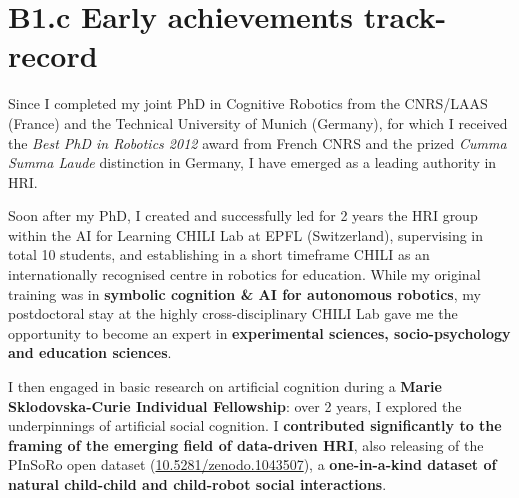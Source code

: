 \documentclass[11pt,a4paper]{report}
\newcommand{\eu}[1]{}
\begin{document}
\newpage
\chapter{B1.c Early achievements track-record}\label{early-achievements-track-record}

\eu{should list your important achievements,
including your most important publications (up to five for Starting Grant and up to ten for
Consolidator Grant) highlighting those as main author and/or without the co-authorship of your PhD
supervisor. The publications should be properly referenced, including all authors in the published
order (Please see section 1.1 on Research integrity). Field relevant bibliometric indicators as well as
research monographs and any translations thereof may also be included. If applicable include:
granted patent(s); invited presentations to internationally established conferences and/or
international advanced schools; Prizes/Awards/Academy memberships etc.}
\eu{(max 2 pages)}

Since I completed my joint PhD in Cognitive Robotics from the CNRS/LAAS (France) and the
Technical University of Munich (Germany), for which I received the \emph{Best
PhD in Robotics 2012} award from French CNRS and the prized \emph{Cumma Summa
Laude} distinction in Germany, I have emerged as a leading authority in
HRI.

Soon after my PhD, I created and successfully led for 2 years the HRI group
within the AI for Learning CHILI Lab at EPFL (Switzerland), supervising in total
10 students, and establishing in a short timeframe CHILI as an internationally
recognised centre in robotics for education. While my original training was in
\textbf{symbolic cognition \& AI for autonomous robotics}, my postdoctoral stay
at the highly cross-disciplinary CHILI Lab gave me the opportunity to become an
expert in \textbf{experimental sciences, socio-psychology and education
sciences}.

I then engaged in basic research on artificial cognition during a \textbf{Marie
Sklodovska-Curie Individual Fellowship}: over 2 years, I explored the underpinnings of
artificial social cognition. I \textbf{contributed significantly to the framing
of the emerging field of data-driven HRI}, also releasing of the PInSoRo open
dataset (\href{https://doi.org/10.5281/zenodo.1043507}{10.5281/zenodo.1043507}),
a \textbf{one-in-a-kind dataset of natural child-child and child-robot social
interactions}.
\end{document}
